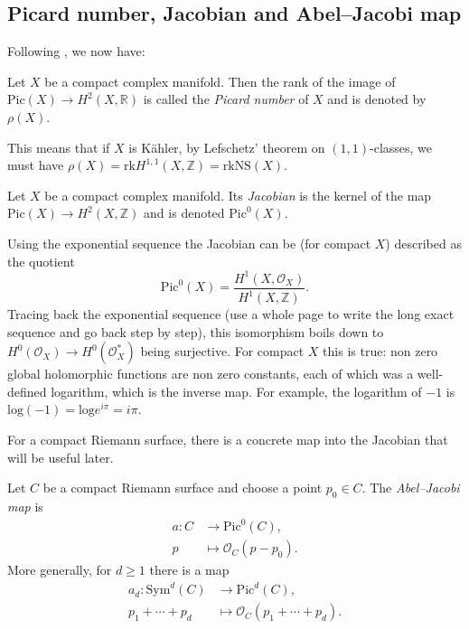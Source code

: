 \subsection{Picard number, Jacobian and
Abel--Jacobi
map}
\label{subsection-jacobian-abel-jacobi}

Following \cite{huc}, we now have:

\begin{definition}
\label{definition-picard-number}
Let $X$ be a compact complex manifold.
Then the rank of the image of
$\text{Pic}(X) \to H^2(X,\mathbb{R})$
is called the {\it Picard number} of
$X$ and is denoted by $\rho(X)$.
\end{definition}

\noindent
This means that if $X$ is Kähler,
by Lefschetz' theorem on $(1,1)$-classes,
we must have
$\rho(X) = \text{rk} H^{1,1}(X,\mathbb{Z})
= \text{rk} \text{NS}(X)$.

\begin{definition}
\label{definition-jacobian}
Let $X$ be a compact complex manifold.
Its {\it Jacobian} is the kernel of the map
$\text{Pic}(X) \to H^2(X,\mathbb{Z})$
and is denoted $\text{Pic}^0(X)$.
\end{definition}

\noindent
Using the exponential sequence
the Jacobian can be (for compact $X$)
described
as the quotient
$$
\text{Pic}^0(X)=
\frac{H^1(X,\mathcal{O}_X)}{
H^1(X,\mathbb{Z})}.
$$
Tracing back the exponential sequence
(use a whole page to write the long
exact sequence and go back step by step),
this isomorphism boils down to
$H^0(\mathcal{O}_X) \to H^0(\mathcal{O}_X^*)$
being surjective.
For compact $X$ this is true:
non zero global holomorphic
functions are non zero constants,
each of which was a well-defined
logarithm, which is the inverse map.
For example, the logarithm of $-1$
is $\text{log}(-1)=\text{log} e^{i\pi}
=i\pi$.

\medskip\noindent
For a compact Riemann surface, there is a
concrete map into the Jacobian that will be
useful later.

\begin{definition}
\label{definition-abel-jacobi}
Let $C$ be a compact Riemann surface and
choose a point $p_0\in C$. The
{\it Abel--Jacobi map} is
$$
\begin{aligned}
a:C&\longrightarrow\text{Pic}^0(C),\\
p&\longmapsto
\mathcal{O}_C(p-p_0).
\end{aligned}
$$
More generally, for $d\geq 1$ there is a
map
$$
\begin{aligned}
a_d:\text{Sym}^d(C)
&\longrightarrow\text{Pic}^d(C),\\
p_1+\cdots+p_d
&\longmapsto
\mathcal{O}_C(p_1+\cdots+p_d).
\end{aligned}
$$
\end{definition}

